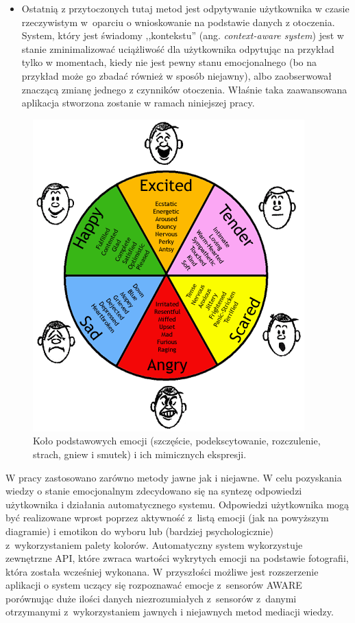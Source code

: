 \begin{itemize}
	\item Ostatnią z przytoczonych tutaj metod jest odpytywanie użytkownika w czasie rzeczywistym w~oparciu o wnioskowanie na podstawie danych z otoczenia. System, który jest świadomy ,,kontekstu'' (ang. \textit{context-aware system}) jest w stanie zminimalizować uciążliwość dla użytkownika odpytując na przykład tylko w momentach, kiedy nie jest pewny stanu emocjonalnego (bo na przykład może go zbadać również w sposób niejawny), albo zaobserwował znaczącą zmianę jednego z czynników otoczenia. Właśnie taka zaawansowana aplikacja stworzona zostanie w ramach niniejszej pracy.
\end{itemize}
	
\begin{figure}[H]
	\centering
	\includegraphics[scale=1]{rozdzial2/ModelEkmana.png}
	\caption{Koło podstawowych emocji (szczęście, podekscytowanie, rozczulenie, strach, gniew i smutek) i ich mimicznych ekspresji.}
\end{figure}

W pracy zastosowano zarówno metody jawne jak i niejawne. W celu pozyskania wiedzy o stanie emocjonalnym zdecydowano się na syntezę odpowiedzi użytkownika i działania automatycznego systemu. Odpowiedzi użytkownika mogą być realizowane wprost poprzez aktywność z~listą emocji (jak na powyższym diagramie) i emotikon do wyboru lub (bardziej psychologicznie) z~wykorzystaniem palety kolorów. Automatyczny system wykorzystuje zewnętrzne API, które zwraca wartości wykrytych emocji na podstawie fotografii, która została wcześniej wykonana. W przyszłości możliwe jest rozszerzenie aplikacji o system uczący się rozpoznawać emocje z~sensorów AWARE porównując duże ilości danych niezrozumiałych z~sensorów z~danymi otrzymanymi z~wykorzystaniem jawnych i niejawnych metod mediacji wiedzy.
